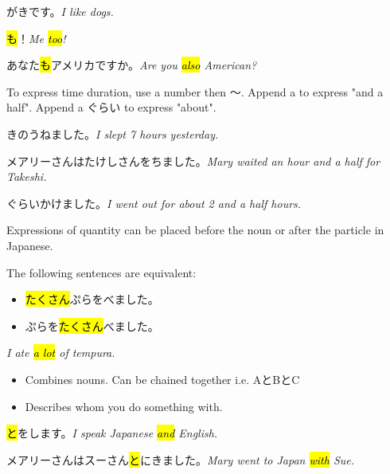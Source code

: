    {
    がきです。\textit{I like dogs.}
    
    \hl{も}！\textit{Me \hl{too}!}
    
    \sectionSplit
    
    あなた\hl{も}アメリカですか。\textit{Are you \hl{also} American?}
    }

    {
    To express time duration, use a number then 〜.
    Append a  to express "and a half".
    Append a ぐらい to express "about".
    
    きのうねました。\textit{I slept 7 hours yesterday.}
    
    メアリーさんはたけしさんをちました。\textit{Mary waited an hour and a half for Takeshi.}
    
    ぐらいかけました。\textit{I went out for about 2 and a half hours.}
    }
    
    {
    Expressions of quantity can be placed before the noun or after the particle in Japanese.
    
    The following sentences are equivalent:
    \begin{itemize}
        \item \hl{たくさん}ぷらをべました。
        \item {}ぷらを\hl{たくさん}べました。
    \end{itemize}
    \textit{I ate \hl{a lot} of tempura.}
    }

    {
    \begin{itemize}
        \item Combines nouns. Can be chained together i.e. AとBとC
        \item Describes whom you do something with.
    \end{itemize}
    
    \hl{と}をします。\textit{I speak Japanese \hl{and} English.}
    
    メアリーさんはスーさん\hl{と}にきました。\textit{Mary went to Japan \hl{with} Sue.}
    }